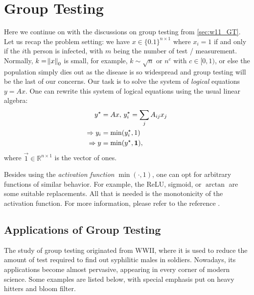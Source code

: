 \section{Group Testing} \label{sec:w12_GT}

Here we continue on with the discussions on group testing from \autoref{sec:w11_GT}. Let us recap the problem setting: we have $x\in\{0.1\}^{n\times1}$ where $x_i=1$ if and only if the $i$th person is infected, with $m$ being the number of test / measurement. Normally, $k=\norm{x}_0$ is small, for example, $k\sim\sqrt{n}$ or $n^c$ with $c\in[0,1)$, or else the population simply dies out as the disease is so widespread and group testing will be the last of our concerns. Our task is to solve the system of \textit{logical} equations $y=Ax$. One can rewrite this system of logical equations using the usual linear algebra:
\begin{align}
    y^\star &= Ax,\, y^\star_i = \sum_{j}A_{ij}x_j \notag\\
    \Rightarrow y_i &= \min(y^\star_i,1) \\
    \Rightarrow y &= \min(y^\star,\vec{1}),
\end{align}
where $\vec{1}\in\mathbb{R}^{n\times1}$ is the vector of ones.

Besides using the \textit{activation function} $\min(\cdot,1)$, one can opt for arbitrary functions of similar behavior. For example, the ReLU, sigmoid, or $\arctan$ are some suitable replacements. All that is needed is the monotonicity of the activation function. For more information, please refer to the reference \cite{Generalized_Group_Testing}.

\subsection{Applications of Group Testing}
The study of group testing originated from WWI\!I, where it is used to reduce the amount of test required to find out syphilitic males in soldiers. Nowadays, its applications become almost pervasive, appearing in every corner of modern science. Some examples are listed below, with special emphasis put on heavy hitters and bloom filter.

